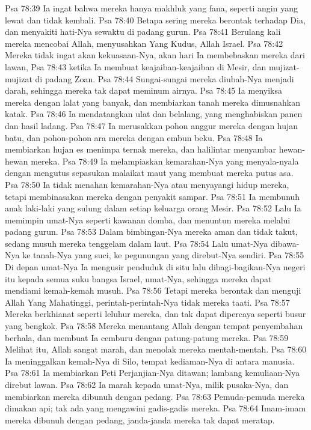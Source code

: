 Psa 78:39  Ia ingat bahwa mereka hanya makhluk yang fana, seperti angin yang lewat dan tidak kembali.
Psa 78:40  Betapa sering mereka berontak terhadap Dia, dan menyakiti hati-Nya sewaktu di padang gurun.
Psa 78:41  Berulang kali mereka mencobai Allah, menyusahkan Yang Kudus, Allah Israel.
Psa 78:42  Mereka tidak ingat akan kekuasaan-Nya, akan hari Ia membebaskan mereka dari lawan,
Psa 78:43  ketika Ia membuat keajaiban-keajaiban di Mesir, dan mujizat-mujizat di padang Zoan.
Psa 78:44  Sungai-sungai mereka diubah-Nya menjadi darah, sehingga mereka tak dapat meminum airnya.
Psa 78:45  Ia menyiksa mereka dengan lalat yang banyak, dan membiarkan tanah mereka dimusnahkan katak.
Psa 78:46  Ia mendatangkan ulat dan belalang, yang menghabiskan panen dan hasil ladang.
Psa 78:47  Ia merusakkan pohon anggur mereka dengan hujan batu, dan pohon-pohon ara mereka dengan embun beku.
Psa 78:48  Ia membiarkan hujan es menimpa ternak mereka, dan halilintar menyambar hewan-hewan mereka.
Psa 78:49  Ia melampiaskan kemarahan-Nya yang menyala-nyala dengan mengutus sepasukan malaikat maut yang membuat mereka putus asa.
Psa 78:50  Ia tidak menahan kemarahan-Nya atau menyayangi hidup mereka, tetapi membinasakan mereka dengan penyakit sampar.
Psa 78:51  Ia membunuh anak laki-laki yang sulung dalam setiap keluarga orang Mesir.
Psa 78:52  Lalu Ia memimpin umat-Nya seperti kawanan domba, dan menuntun mereka melalui padang gurun.
Psa 78:53  Dalam bimbingan-Nya mereka aman dan tidak takut, sedang musuh mereka tenggelam dalam laut.
Psa 78:54  Lalu umat-Nya dibawa-Nya ke tanah-Nya yang suci, ke pegunungan yang direbut-Nya sendiri.
Psa 78:55  Di depan umat-Nya Ia mengusir penduduk di situ lalu dibagi-bagikan-Nya negeri itu kepada semua suku bangsa Israel, umat-Nya, sehingga mereka dapat mendiami kemah-kemah musuh.
Psa 78:56  Tetapi mereka berontak dan menguji Allah Yang Mahatinggi, perintah-perintah-Nya tidak mereka taati.
Psa 78:57  Mereka berkhianat seperti leluhur mereka, dan tak dapat dipercaya seperti busur yang bengkok.
Psa 78:58  Mereka menantang Allah dengan tempat penyembahan berhala, dan membuat Ia cemburu dengan patung-patung mereka.
Psa 78:59  Melihat itu, Allah sangat marah, dan menolak mereka mentah-mentah.
Psa 78:60  Ia meninggalkan kemah-Nya di Silo, tempat kediaman-Nya di antara manusia.
Psa 78:61  Ia membiarkan Peti Perjanjian-Nya ditawan; lambang kemuliaan-Nya direbut lawan.
Psa 78:62  Ia marah kepada umat-Nya, milik pusaka-Nya, dan membiarkan mereka dibunuh dengan pedang.
Psa 78:63  Pemuda-pemuda mereka dimakan api; tak ada yang mengawini gadis-gadis mereka.
Psa 78:64  Imam-imam mereka dibunuh dengan pedang, janda-janda mereka tak dapat meratap.
